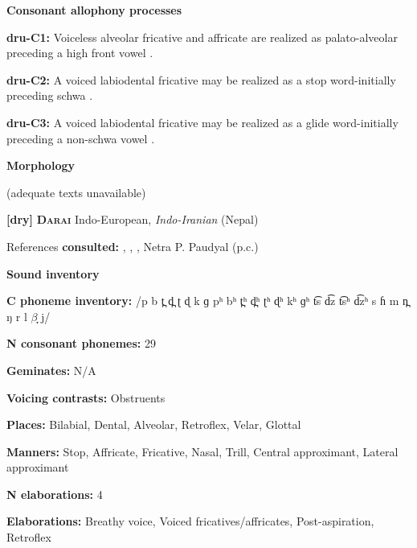 \textbf{Consonant allophony processes}



\textbf{dru-C1:} Voiceless alveolar fricative and affricate are realized as palato-alveolar preceding a high front vowel \citep[230]{Chen2006}.



\textbf{dru-C2:} A voiced labiodental fricative may be realized as a stop word-initially preceding schwa \citep[227]{Chen2006}.



\textbf{dru-C3:} A voiced labiodental fricative may be realized as a glide word-initially preceding a non-schwa vowel \citep[227]{Chen2006}.



\textbf{Morphology}



(adequate texts unavailable)



\textbf{[dry]}   \textbf{\textsc{Darai}}    Indo-European, \textit{Indo-Iranian} (Nepal)



References \textbf{consulted:} \citet{Dhakal2012}, \citet{KotapishKotapish1978}, \citet{Paudyal2003}, Netra P. Paudyal (p.c.)



\textbf{Sound inventory}



\textbf{C phoneme inventory:} /p b t̪ d̪ ʈ ɖ k ɡ pʰ bʰ t̪ʰ d̪ʰ ʈʰ ɖʰ kʰ ɡʰ t͡s d͡z t͡sʰ d͡zʰ s ɦ m n̪ ŋ r l $\beta ̞$ j/



\textbf{N consonant phonemes:} 29



\textbf{Geminates:} N/A



\textbf{Voicing contrasts:} Obstruents



\textbf{Places:} Bilabial, Dental, Alveolar, Retroflex, Velar, Glottal



\textbf{Manners:} Stop, Affricate, Fricative, Nasal, Trill, Central approximant, Lateral approximant



\textbf{N elaborations:} 4



\textbf{Elaborations:} Breathy voice, Voiced fricatives/affricates, Post-aspiration, Retroflex



